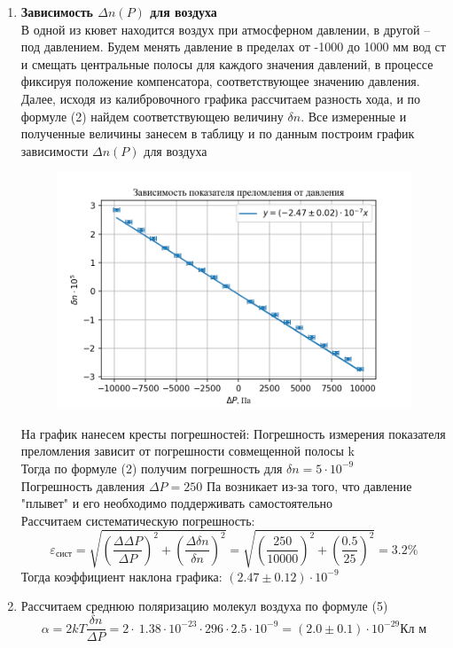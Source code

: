 \documentclass[a4paper,12pt]{article}
\begin{document}
\begin{enumerate}
\item \textbf{Зависимость $\Delta n(P)$ для воздуха}\\
В одной из кювет находится воздух при атмосферном давлении, в другой -- под давлением. Будем менять давление в пределах от -1000 до 1000 мм вод ст и смещать центральные полосы для каждого значения давлений, в процессе фиксируя положение компенсатора, соответствующее значению давления. Далее, исходя из калибровочного графика рассчитаем разность хода, и по формуле (2) найдем соответствующею величину $\delta n$. Все измеренные и полученные величины занесем в таблицу и по данным построим график зависимости $\Delta n(P)$ для воздуха
\begin{figure}[h!]
\includegraphics[scale=0.9]{plot_2.png} 
\end{figure}
 На график нанесем кресты погрешностей: Погрешность измерения показателя преломления зависит от погрешности совмещенной полосы k\\
 Тогда по формуле (2) получим погрешность для $\delta n = 5\cdot 10^{-9}$  \\
 Погрешность давления $\Delta P = 250$ Па возникает из-за того, что давление "плывет" и его необходимо поддерживать самостоятельно\\
 Рассчитаем систематическую погрешность:
 $$\varepsilon_{\text{сист}} = \sqrt{(\frac{\Delta\Delta P}{\Delta P})^2 + (\frac{\Delta\delta n}{\delta n})^2}=\sqrt{(\frac{250}{10000})^2 + (\frac{0.5}{25})^2} = 3.2 \%$$
 Тогда коэффициент наклона графика: $(2.47 \pm 0.12) \cdot 10^{-9}$
 \item Рассчитаем среднюю поляризацию молекул воздуха по формуле (5)
 \[\alpha = 2kT\frac{\delta n }{\Delta P} = 2 \cdot\ 1.38\cdot 10^{-23} \cdot 296 \cdot 2.5\cdot 10^{-9}= (2.0\pm 0.1) \cdot 10^{-29}\text{Кл м}\]

\end{enumerate}
\end{document}
